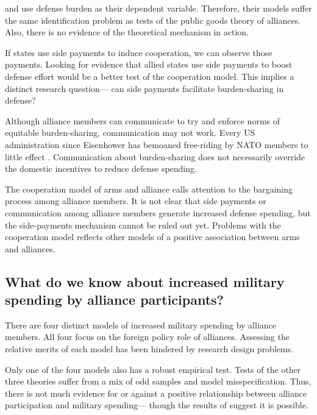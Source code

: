 \documentclass[12pt]{article}
\begin{document}
\citet{Palmer1990} and \citet{QuirozFlores2011} use defense burden as their dependent variable.
Therefore, their models suffer the same identification problem as tests of the public goods theory of alliances. 
Also, there is no evidence of the theoretical mechanism in action. 

If states use side payments to induce cooperation, we can observe those payments. 
Looking for evidence that allied states use side payments to boost defense effort would be a better test of the cooperation model. 
This implies a distinct research question--- can side payments facilitate burden-sharing in defense? 


Although alliance members can communicate to try and enforce norms of equitable burden-sharing, communication may not work.  
Every US administration since Eisenhower has bemoaned free-riding by NATO members to little effect \citep{Lanoszka2015}. 
Communication about burden-sharing does not necessarily override the domestic incentives to reduce defense spending. 



The cooperation model of arms and alliance calls attention to the bargaining process among alliance members. 
It is not clear that side payments or communication among alliance members generate increased defense spending, but the side-payments mechanism cannot be ruled out yet. 
Problems with the cooperation model reflects other models of a positive association between arms and alliances.  



\subsection{What do we know about increased military spending by alliance participants?} 


There are four distinct models of increased military spending by alliance members.
All four focus on the foreign policy role of alliances. 
Assessing the relative merits of each model has been hindered by research design problems. 


Only one of the four models also has a robust empirical test. 
Tests of the other three theories suffer from a mix of odd samples and model misspecification. 
Thus, there is not much evidence for or against a positive relationship between alliance participation and military spending--- though the results of \citet{Horowitzetal2017} suggest it is possible. 
\end{document}
